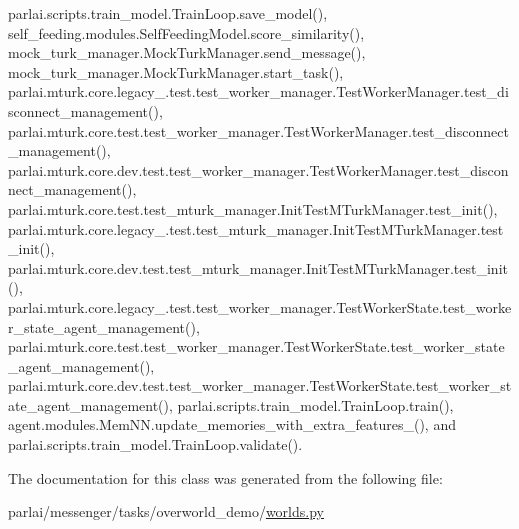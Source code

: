 parlai.\+scripts.\+train\+\_\+model.\+Train\+Loop.\+save\+\_\+model(), self\+\_\+feeding.\+modules.\+Self\+Feeding\+Model.\+score\+\_\+similarity(), mock\+\_\+turk\+\_\+manager.\+Mock\+Turk\+Manager.\+send\+\_\+message(), mock\+\_\+turk\+\_\+manager.\+Mock\+Turk\+Manager.\+start\+\_\+task(), parlai.\+mturk.\+core.\+legacy\+\_.\+test.\+test\+\_\+worker\+\_\+manager.\+Test\+Worker\+Manager.\+test\+\_\+disconnect\+\_\+management(), parlai.\+mturk.\+core.\+test.\+test\+\_\+worker\+\_\+manager.\+Test\+Worker\+Manager.\+test\+\_\+disconnect\+\_\+management(), parlai.\+mturk.\+core.\+dev.\+test.\+test\+\_\+worker\+\_\+manager.\+Test\+Worker\+Manager.\+test\+\_\+disconnect\+\_\+management(), parlai.\+mturk.\+core.\+test.\+test\+\_\+mturk\+\_\+manager.\+Init\+Test\+M\+Turk\+Manager.\+test\+\_\+init(), parlai.\+mturk.\+core.\+legacy\+\_.\+test.\+test\+\_\+mturk\+\_\+manager.\+Init\+Test\+M\+Turk\+Manager.\+test\+\_\+init(), parlai.\+mturk.\+core.\+dev.\+test.\+test\+\_\+mturk\+\_\+manager.\+Init\+Test\+M\+Turk\+Manager.\+test\+\_\+init(), parlai.\+mturk.\+core.\+legacy\+\_.\+test.\+test\+\_\+worker\+\_\+manager.\+Test\+Worker\+State.\+test\+\_\+worker\+\_\+state\+\_\+agent\+\_\+management(), parlai.\+mturk.\+core.\+test.\+test\+\_\+worker\+\_\+manager.\+Test\+Worker\+State.\+test\+\_\+worker\+\_\+state\+\_\+agent\+\_\+management(), parlai.\+mturk.\+core.\+dev.\+test.\+test\+\_\+worker\+\_\+manager.\+Test\+Worker\+State.\+test\+\_\+worker\+\_\+state\+\_\+agent\+\_\+management(), parlai.\+scripts.\+train\+\_\+model.\+Train\+Loop.\+train(), agent.\+modules.\+Mem\+N\+N.\+update\+\_\+memories\+\_\+with\+\_\+extra\+\_\+features\+\_\+(), and parlai.\+scripts.\+train\+\_\+model.\+Train\+Loop.\+validate().



The documentation for this class was generated from the following file\+:\begin{DoxyCompactItemize}
\item 
parlai/messenger/tasks/overworld\+\_\+demo/\hyperlink{parlai_2messenger_2tasks_2overworld__demo_2worlds_8py}{worlds.\+py}\end{DoxyCompactItemize}
